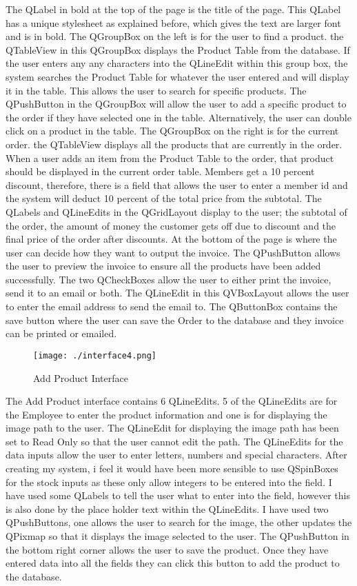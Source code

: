 The QLabel in bold at the top of the page is the title of the page. This QLabel has a unique stylesheet as explained before, which gives the text are larger font and is in bold. The QGroupBox on the left is for the user to find a product. the QTableView in this QGroupBox displays the Product Table from the database. If the user enters any any characters into the QLineEdit within this group box, the system searches the Product Table for whatever the user entered and will display it in the table. This allows the user to search for specific products. The QPushButton in the QGroupBox will allow the user to add a specific product to the order if they have selected one in the table. Alternatively, the user can double click on a product in the table. The QGroupBox on the right is for the current order. the QTableView displays all the products that are currently in the order. When a user adds an item from the Product Table to the order, that product should be displayed in the current order table. Members get a 10 percent discount, therefore, there is a field that allows the user to enter a member id and the system will deduct 10 percent of the total price from the subtotal. The QLabels and QLineEdits in the QGridLayout display to the user; the subtotal of the order, the amount of money the customer gets off due to discount and the final price of the order after discounts. At the bottom of the page is where the user can decide how they want to output the invoice. The QPushButton allows the user to preview the invoice to ensure all the products have been added successfully. The two QCheckBoxes allow the user to either print the invoice, send it to an email or both. The QLineEdit in this QVBoxLayout allows the user to enter the email address to send the email to. The QButtonBox contains the save button where the user can save the Order to the database and they invoice can be printed or emailed.

\begin{figure}[H]
    \texttt{[image: ./interface4.png]}
    \caption{Add Product Interface} \label{fig:add-product-interface}
\end{figure}

The Add Product interface contains 6 QLineEdits. 5 of the QLineEdits are for the Employee to enter the product information and one is for displaying the image path to the user. The QLineEdit for displaying the image path has been set to Read Only so that the user cannot edit the path. The QLineEdits for the data inputs allow the user to enter letters, numbers and special characters. After creating my system, i feel it would have been more sensible to use QSpinBoxes for the stock inputs as these only allow integers to be entered into the field. I have used some QLabels to tell the user what to enter into the field, however this is also done by the place holder text within the QLineEdits. I have used two QPushButtons, one allows the user to search for the image, the other updates the QPixmap so that it displays the image selected to the user. The QPushButton in the bottom right corner allows the user to save the product. Once they have entered data into all the fields they can click this button to add the product to the database.


